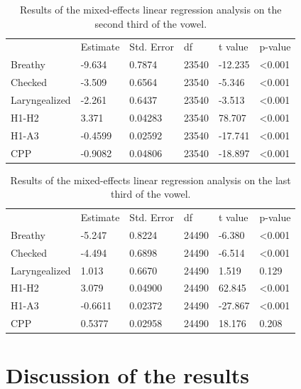 \documentclass[12pt, letterpaper]{article}
\providecommand{\lsptoprule}{\midrule\toprule}
\providecommand{\lspbottomrule}{\bottomrule\midrule}
\begin{document}
\begin{table}[!h]
	\centering
	\caption{Results of the mixed-effects linear regression analysis on the second third of the vowel. }
	\label{tab:tones}
	 \begin{tabular}{llllll}
	  \lsptoprule
						&  Estimate  & Std. Error & df & t value & p-value \\
	  	Breathy   		&  -9.634 	& 0.7874	& 23540 & -12.235 & <0.001\\
		Checked    		&  -3.509	& 0.6564	& 23540 & -5.346 & <0.001 \\
		Laryngealized	& -2.261	& 0.6437	& 23540	& -3.513 & <0.001 \\
		H1-H2			& 3.371		& 0.04283	& 23540	 & 78.707 & <0.001\\
		H1-A3			& -0.4599	& 0.02592	& 23540	& -17.741	& <0.001\\
		CPP				& -0.9082	& 0.04806	& 23540	& -18.897	& <0.001\\
	  \lspbottomrule
	 \end{tabular}
\end{table}

\begin{table}[!h]
	\centering
	\caption{Results of the mixed-effects linear regression analysis on the last third of the vowel. }
	\label{tab:tones}
	 \begin{tabular}{llllll}
	  \lsptoprule
						&  Estimate  & Std. Error & df & t value & p-value \\
	  	Breathy   		& -5.247  	& 0.8224	&  24490	& -6.380	& <0.001\\
		Checked    		& -4.494  	& 0.6898	&  24490	& -6.514	& <0.001 \\
		Laryngealized	& 1.013		& 0.6670	&  24490	& 1.519		& 0.129 \\
		H1-H2			& 3.079		& 0.04900	&  24490	& 62.845	& <0.001\\
		H1-A3			& -0.6611 	& 0.02372	&  24490	& -27.867	& <0.001\\
		CPP				& 0.5377	& 0.02958	&  24490	& 18.176	& 0.208\\
	  \lspbottomrule
	 \end{tabular}
\end{table}

\section{Discussion of the results} \label{sec:Discussion}
\end{document}
